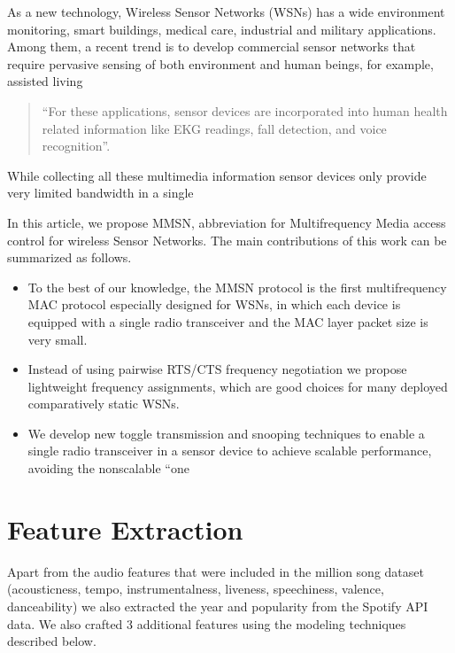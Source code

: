 \documentclass[acmtog, authorversion]{acmart}
\begin{document}
As a new technology, Wireless Sensor Networks (WSNs) has a wide
environment monitoring, smart buildings, medical care, industrial and
military applications. Among them, a recent trend is to develop
commercial sensor networks that require pervasive sensing of both
environment and human beings, for example, assisted living
\begin{quote}
  ``For these applications, sensor devices are incorporated into human
  health related information like EKG readings, fall detection, and
  voice recognition''.
\end{quote}
While collecting all these multimedia information
sensor devices only provide very limited bandwidth in a single

In this article, we propose MMSN, abbreviation for Multifrequency
Media access control for wireless Sensor Networks. The main
contributions of this work can be summarized as follows.
\begin{itemize}
\item To the best of our knowledge, the MMSN protocol is the first
multifrequency MAC protocol especially designed for WSNs, in which
each device is equipped with a single radio transceiver and
the MAC layer packet size is very small.
\item Instead of using pairwise RTS/CTS frequency negotiation
we propose lightweight frequency assignments, which are good choices
for many deployed comparatively static WSNs.
\item We develop new toggle transmission and snooping techniques to
enable a single radio transceiver in a sensor device to achieve
scalable performance, avoiding the nonscalable ``one
\end{itemize}

\section{Feature Extraction}

Apart from the audio features that were included in the million song dataset (acousticness, tempo, instrumentalness, liveness, speechiness, valence, danceability) we also extracted the year and popularity from the Spotify API data. We also crafted 3 additional features using the modeling techniques described below.
\end{document}
